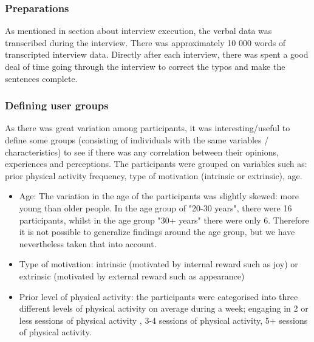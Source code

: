     
    \subsubsection{Preparations}
    As mentioned in section about interview execution, the verbal data was transcribed during the interview. There was approximately 10 000 words of transcripted interview data. 
    Directly after each interview, there was spent a good deal of time going through the interview to correct the typos and make the sentences complete. 

    \subsubsection{Defining user groups}
    As there was great variation among participants, it was interesting/useful to define some groups (consisting of individuals with the same variables / characteristics) to see if there was any correlation between their opinions, experiences and perceptions. The participants were grouped on variables such as: prior physical activity frequency, type of motivation (intrinsic or extrinsic), age.
    
    \begin{itemize}
    \item Age: The variation in the age of the participants was slightly skewed: more young than older people. In the age group of "20-30 years", there were 16 participants, whilst in the age group "30+ years" there were only 6. Therefore it is not possible to generalize findings around the age group, but we have nevertheless taken that into account.
    \item     Type of motivation: intrinsic (motivated by internal reward such as joy) or extrinsic (motivated by external reward such as appearance)
    \item     Prior level of physical activity: the participants were categorised into three different levels of physical activity on average during a week; engaging in 2 or less sessions of physical activity , 3-4 sessions of physical activity, 5+ sessions of physical activity. 
    \end{itemize}
    
